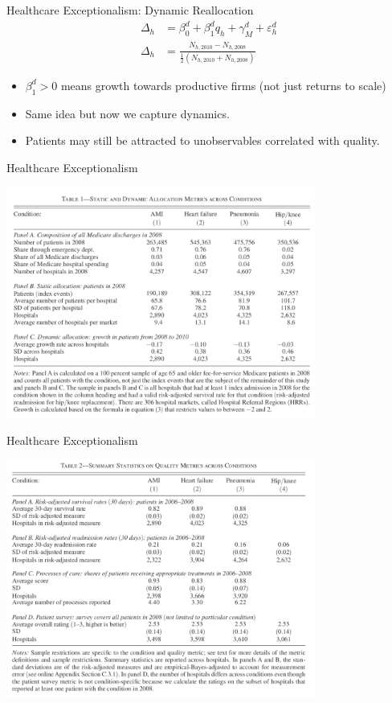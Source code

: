 \documentclass[xcolor=pdftex,dvipsnames,table,mathserif,aspectratio=169]{beamer}
\begin{document}
\begin{frame}{Healthcare Exceptionalism: Dynamic Reallocation}
\begin{align*}
\Delta_{h}&=\beta_{0}^{d}+\beta_{1}^{d} q_{h}+\gamma_{M}^{d}+\varepsilon_{h}^{d}\\
\Delta_{h}&=\frac{N_{h, 2010}-N_{h, 2008}}{\frac{1}{2}\left(N_{h, 2010}+N_{h, 2008}\right)}
\end{align*}
\begin{itemize}
\item $\beta_1^d>0$ means growth towards productive firms (not just returns to scale)
\item Same idea but now we capture \alert{dynamics}.
\item Patients may still be attracted to \alert{unobservables correlated with quality}.
\end{itemize}
\end{frame}


\begin{frame}{Healthcare Exceptionalism}
\begin{center}
\includegraphics[width=4in]{./resources/hc1.png}
\end{center}
\end{frame}

\begin{frame}{Healthcare Exceptionalism}
\begin{center}
\includegraphics[width=4in]{./resources/hc2.png}
\end{center}
\end{frame}
\end{document}
